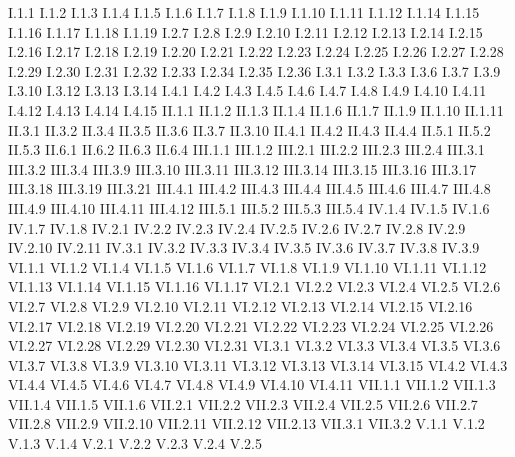 I.1.1
I.1.2
I.1.3
I.1.4
I.1.5
I.1.6
I.1.7
I.1.8
I.1.9
I.1.10
I.1.11
I.1.12
I.1.14
I.1.15
I.1.16
I.1.17
I.1.18
I.1.19
I.2.7
I.2.8
I.2.9
I.2.10
I.2.11
I.2.12
I.2.13
I.2.14
I.2.15
I.2.16
I.2.17
I.2.18
I.2.19
I.2.20
I.2.21
I.2.22
I.2.23
I.2.24
I.2.25
I.2.26
I.2.27
I.2.28
I.2.29
I.2.30
I.2.31
I.2.32
I.2.33
I.2.34
I.2.35
I.2.36
I.3.1
I.3.2
I.3.3
I.3.6
I.3.7
I.3.9
I.3.10
I.3.12
I.3.13
I.3.14
I.4.1
I.4.2
I.4.3
I.4.5
I.4.6
I.4.7
I.4.8
I.4.9
I.4.10
I.4.11
I.4.12
I.4.13
I.4.14
I.4.15
II.1.1
II.1.2
II.1.3
II.1.4
II.1.6
II.1.7
II.1.9
II.1.10
II.1.11
II.3.1
II.3.2
II.3.4
II.3.5
II.3.6
II.3.7
II.3.10
II.4.1
II.4.2
II.4.3
II.4.4
II.5.1
II.5.2
II.5.3
II.6.1
II.6.2
II.6.3
II.6.4
III.1.1
III.1.2
III.2.1
III.2.2
III.2.3
III.2.4
III.3.1
III.3.2
III.3.4
III.3.9
III.3.10
III.3.11
III.3.12
III.3.14
III.3.15
III.3.16
III.3.17
III.3.18
III.3.19
III.3.21
III.4.1
III.4.2
III.4.3
III.4.4
III.4.5
III.4.6
III.4.7
III.4.8
III.4.9
III.4.10
III.4.11
III.4.12
III.5.1
III.5.2
III.5.3
III.5.4
IV.1.4
IV.1.5
IV.1.6
IV.1.7
IV.1.8
IV.2.1
IV.2.2
IV.2.3
IV.2.4
IV.2.5
IV.2.6
IV.2.7
IV.2.8
IV.2.9
IV.2.10
IV.2.11
IV.3.1
IV.3.2
IV.3.3
IV.3.4
IV.3.5
IV.3.6
IV.3.7
IV.3.8
IV.3.9
VI.1.1
VI.1.2
VI.1.4
VI.1.5
VI.1.6
VI.1.7
VI.1.8
VI.1.9
VI.1.10
VI.1.11
VI.1.12
VI.1.13
VI.1.14
VI.1.15
VI.1.16
VI.1.17
VI.2.1
VI.2.2
VI.2.3
VI.2.4
VI.2.5
VI.2.6
VI.2.7
VI.2.8
VI.2.9
VI.2.10
VI.2.11
VI.2.12
VI.2.13
VI.2.14
VI.2.15
VI.2.16
VI.2.17
VI.2.18
VI.2.19
VI.2.20
VI.2.21
VI.2.22
VI.2.23
VI.2.24
VI.2.25
VI.2.26
VI.2.27
VI.2.28
VI.2.29
VI.2.30
VI.2.31
VI.3.1
VI.3.2
VI.3.3
VI.3.4
VI.3.5
VI.3.6
VI.3.7
VI.3.8
VI.3.9
VI.3.10
VI.3.11
VI.3.12
VI.3.13
VI.3.14
VI.3.15
VI.4.2
VI.4.3
VI.4.4
VI.4.5
VI.4.6
VI.4.7
VI.4.8
VI.4.9
VI.4.10
VI.4.11
VII.1.1
VII.1.2
VII.1.3
VII.1.4
VII.1.5
VII.1.6
VII.2.1
VII.2.2
VII.2.3
VII.2.4
VII.2.5
VII.2.6
VII.2.7
VII.2.8
VII.2.9
VII.2.10
VII.2.11
VII.2.12
VII.2.13
VII.3.1
VII.3.2
V.1.1
V.1.2
V.1.3
V.1.4
V.2.1
V.2.2
V.2.3
V.2.4
V.2.5      

